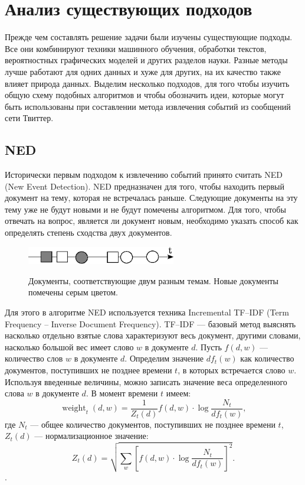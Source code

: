 \documentclass[12pt, a4paper]{article}
\newcommand\todo[1]{\marginpar{\textcolor{red}{#1}}}
\DeclareMathOperator{\weight}{weight}
\begin{document}
  \section{Анализ существующих подходов}
  Прежде чем составлять решение задачи были изучены существующие подходы. Все они комбинируют техники машинного обучения, обработки текстов, вероятностных графических моделей и других разделов науки. Разные методы лучше работают для одних данных и хуже для других, на их качество также влияет природа данных. Выделим несколько подходов, для того чтобы изучить общую схему подобных алгоритмов и чтобы обозначить идеи, которые могут быть использованы при составлении метода извлечения событий из сообщений сети Твиттер.
  
  
  \subsection{NED}
  \label{ned-subsection}
	Исторически первым подходом к извлечению событий принято считать NED (New Event Detection)\cite{ned}. NED предназначен для того, чтобы находить первый документ на тему, которая не встречалась раньше. Следующие документы на эту тему уже не будут новыми и не будут помечены алгоритмом. Для того, чтобы отвечать на вопрос, является ли документ новым, необходимо указать способ как определять степень сходства двух документов.
	
\begin{figure}[H]
  \centering
  \includegraphics[width=0.58\textwidth]{ned.eps}
  \\
  \caption{Документы, соответствующие двум разным темам. Новые документы помечены серым цветом.}
  \end{figure}  

	Для этого в алгоритме NED используется техника Incremental TF--IDF (Term Frequency -- Inverse Document Frequency). TF--IDF --- базовый метод выяснять насколько отдельно взятые слова характеризуют весь документ, другими словами, насколько большой вес имеет слово $w$ в документе $d$. Пусть $f(d,w)$ --- количество слов $w$ в документе $d$. Определим значение $df_t(w)$ как количество документов, поступивших не позднее времени $t$, в которых встречается слово $w$. Используя введенные величины, можно записать значение веса определенного слова $w$ в документе $d$. В момент времени $t$ имеем:
	\begin{equation}
	\weight_t(d,w) = \frac{1}{Z_t(d)}f(d,w) \cdot \log \frac{N_t}{df_t(w)},
	\end{equation}
	где $N_t$ --- общее количество документов, поступивших не позднее времени $t$, $Z_t(d)$ --- нормализационное значение:
	\begin{equation}
	Z_t(d) = \sqrt{\sum_w \left[ f(d,w) \cdot \log \frac{N_t}{df_t(w)} \right]^2}.
	\end{equation}.
	
\end{document}
